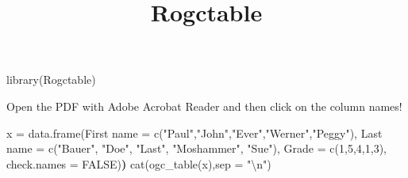 \documentclass[
]{article}
\title{Rogctable}
\author{}
\date{\vspace{-2.5em}}
\newenvironment{Shaded}{\begin{snugshade}}{\end{snugshade}}
\newcommand{\AttributeTok}[1]{\textcolor[rgb]{0.77,0.63,0.00}{#1}}
\newcommand{\ConstantTok}[1]{\textcolor[rgb]{0.00,0.00,0.00}{#1}}
\newcommand{\DecValTok}[1]{\textcolor[rgb]{0.00,0.00,0.81}{#1}}
\newcommand{\ErrorTok}[1]{\textcolor[rgb]{0.64,0.00,0.00}{\textbf{#1}}}
\newcommand{\FunctionTok}[1]{\textcolor[rgb]{0.00,0.00,0.00}{#1}}
\newcommand{\NormalTok}[1]{#1}
\newcommand{\OtherTok}[1]{\textcolor[rgb]{0.56,0.35,0.01}{#1}}
\newcommand{\SpecialCharTok}[1]{\textcolor[rgb]{0.00,0.00,0.00}{#1}}
\newcommand{\StringTok}[1]{\textcolor[rgb]{0.31,0.60,0.02}{#1}}
\begin{document}
\maketitle

\begin{Shaded}
\begin{Highlighting}[]
\FunctionTok{library}\NormalTok{(Rogctable)}
\end{Highlighting}
\end{Shaded}

Open the PDF with Adobe Acrobat Reader and then click on the column
names!

\begin{Shaded}
\begin{Highlighting}[]
\NormalTok{x }\OtherTok{=} \FunctionTok{data.frame}\NormalTok{(}\StringTok{\textasciigrave{}}\AttributeTok{First name}\StringTok{\textasciigrave{}} \OtherTok{=} \FunctionTok{c}\NormalTok{(}\StringTok{"Paul"}\NormalTok{,}\StringTok{"John"}\NormalTok{,}\StringTok{"Ever"}\NormalTok{,}\StringTok{"Werner"}\NormalTok{,}\StringTok{"Peggy"}\NormalTok{),}
               \StringTok{\textasciigrave{}}\AttributeTok{Last name}\StringTok{\textasciigrave{}} \OtherTok{=} \FunctionTok{c}\NormalTok{(}\StringTok{"Bauer"}\NormalTok{, }\StringTok{"Doe"}\NormalTok{, }\StringTok{"Last"}\NormalTok{, }\StringTok{"Moshammer"}\NormalTok{, }\StringTok{"Sue"}\NormalTok{),}
               \StringTok{\textasciigrave{}}\AttributeTok{Grade}\StringTok{\textasciigrave{}} \OtherTok{=} \FunctionTok{c}\NormalTok{(}\DecValTok{1}\NormalTok{,}\DecValTok{5}\NormalTok{,}\DecValTok{4}\NormalTok{,}\DecValTok{1}\NormalTok{,}\DecValTok{3}\NormalTok{),}
               \AttributeTok{check.names =} \ConstantTok{FALSE}\NormalTok{)}\ErrorTok{)}
\FunctionTok{cat}\NormalTok{(}\FunctionTok{ogc\_table}\NormalTok{(x),}\AttributeTok{sep =} \StringTok{"}\SpecialCharTok{\textbackslash{}n}\StringTok{"}\NormalTok{)}
\end{Highlighting}
\end{Shaded}

\end{document}
